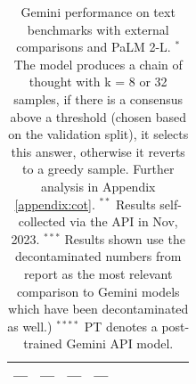 \begin{table}[h!]
\begin{tabular}{p{2.3cm}p{1.25cm}p{1.25cm}|p{1.2cm}p{1.1cm}p{1.2cm}p{1.1cm}p{1.1cm}p{0.9cm}p{1.2cm}}
--- & %
--- & %
--- & %
--- %
\\
\bottomrule
\end{tabular}
\caption{Gemini performance on text benchmarks with external comparisons and PaLM 2-L. \newline
\scriptsize{$^{*}$ The model produces a chain of thought with k = 8 or 32 samples, if there is a consensus above a threshold (chosen based on the validation split), it selects this answer, otherwise it reverts to a greedy sample. Further analysis in Appendix \ref{appendix:cot}.} \newline
\scriptsize{$^{**}$ Results self-collected via the API in Nov, 2023.}  \newline
\scriptsize{$^{***}$ Results shown use the decontaminated numbers from \citet{llama2} report as the most relevant comparison to Gemini models which have been decontaminated as well.)} \newline
\scriptsize{$^{****}$ PT denotes a post-trained Gemini API model.}
}
\label{tab:text-results}
\end{table}